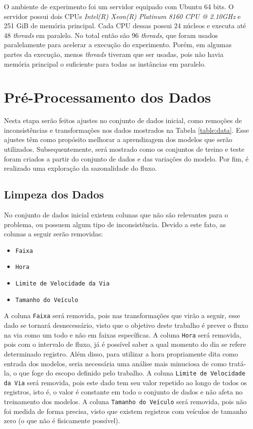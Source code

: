 O ambiente de experimento foi um servidor equipado com Ubuntu 64 bits. O servidor possui dois CPUs \textit{Intel(R) Xeon(R) Platinum 8160 CPU @ 2.10GHz} e 251 GiB de memória principal. Cada CPU dessas possui 24 núcleos e executa até 48 \textit{threads} em paralelo. No total então são 96 \textit{threads}, que foram usados paralelamente para acelerar a execução do experimento. Porém, em algumas partes da execução, menos \textit{threads} tiveram que ser usadas, pois não havia memória principal o suficiente para todas as instâncias em paralelo.

\section{Pré-Processamento dos Dados}

Nesta etapa serão feitos ajustes no conjunto de dados inicial, como remoções de inconsistências e transformações nos dados mostrados na Tabela \ref{table:data}. Esse ajustes têm como propósito melhorar a aprendizagem dos modelos que serão utilizados. Subsequentemente, será mostrado como os conjuntos de treino e teste foram criados a partir do conjunto de dados e das variações do modelo. Por fim, é realizado uma exploração da sazonalidade do fluxo.

\subsection{Limpeza dos Dados}

No conjunto de dados inicial existem colunas que não são relevantes para o problema, ou possuem algum tipo de inconsistência. Devido a este fato, as colunas a seguir serão removidas:

\begin{itemize}
    \item \texttt{Faixa}
    \item  \texttt{Hora}
    \item \texttt{Limite de Velocidade da Via}
    \item  \texttt{Tamanho do Veículo}
\end{itemize}

A coluna \texttt{Faixa} será removida, pois nas transformações que virão a seguir, esse dado se tornará desnecessário, visto que o objetivo deste trabalho é prever o fluxo na via como um todo e não em faixas específicas. A coluna \texttt{Hora} será removida, pois com o intervalo de fluxo, já é possível saber a qual momento do dia se refere determinado registro. Além disso, para utilizar a hora propriamente dita como entrada dos modelos, seria necessária uma análise mais minuciosa de como tratá-la, o que foge do escopo definido pelo trabalho. A coluna \texttt{Limite de Velocidade da Via} será removida, pois este dado tem seu valor repetido ao longo de todos os registros, isto é, o valor é constante em todo o conjunto de dados e não afeta no treinamento dos modelos. A coluna \texttt{Tamanho do Veículo} será removida, pois não foi medida de forma precisa, visto que existem registros com veículos de tamanho zero (o que não é fisicamente possível).


